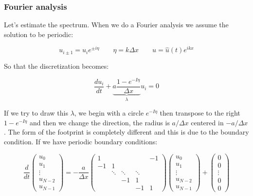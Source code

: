 \subsubsection{Fourier analysis}
Let's estimate the spectrum. When we do a Fourier analysis we assume the solution to be periodic: 

\begin{equation}
u_{i \pm 1} = u_i e^{\pm i\eta} \qquad \eta = k \Delta x \qquad u = \hat{u}(t)e^{ikx}
\end{equation}

So that the discretization becomes: 

\begin{equation}
\frac{du_i}{dt} + \underbrace{a \frac{1- e^{-I\eta}}{\Delta x}}_{\lambda}u_i = 0 
\end{equation}

If we try to draw this $\lambda$, we begin with a circle $e^{-I\eta}$ then transpose to the right $1 - e^{-I\eta}$ and then we change the direction, the radius is $a/\Delta x$ centered in $-a/\Delta x$. The form of the footprint is completely different and this is due to the boundary condition. If we have periodic boundary conditions: 

\begin{equation}
\frac{d}{dt} \left(\begin{array}{c}
u_0\\
u_1 \\
\vdots\\
u_{N-2}\\
u_{N-1}
\end{array} \right) = -\frac{a }{\Delta x}
\left(
\begin{array}{ccccc}
1 & & & & -1 \\
-1 & 1  \\
& \ddots & \ddots & \ddots \\
&  & -1 & 1 \\
& & & -1& 1
\end{array}
\right)\left(\begin{array}{c}
u_0\\
u_1 \\
\vdots\\
u_{N-2}\\
u_{N-1}
\end{array} \right)
+
\left(\begin{array}{c}
0\\
0\\
\vdots\\
0\\
0
\end{array} \right)
\end{equation}

